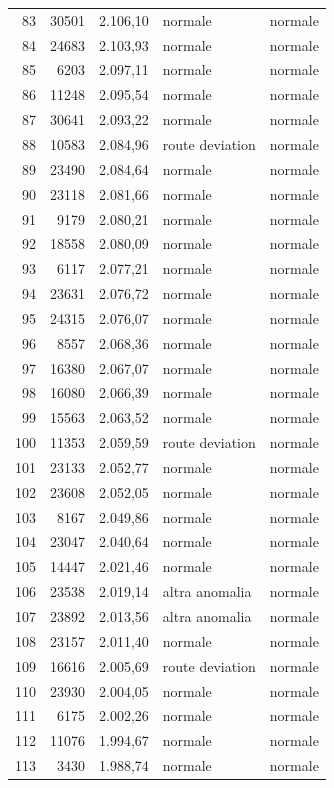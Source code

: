 {\begin{longtable}{rrrll}
83 & 30501 & 2.106,10 & normale & normale \\
84 & 24683 & 2.103,93 & normale & normale \\
85 & 6203 & 2.097,11 & normale & normale \\
86 & 11248 & 2.095,54 & normale & normale \\
87 & 30641 & 2.093,22 & normale & normale \\
88 & 10583 & 2.084,96 & route deviation & normale \\
89 & 23490 & 2.084,64 & normale & normale \\
90 & 23118 & 2.081,66 & normale & normale \\
91 & 9179 & 2.080,21 & normale & normale \\
92 & 18558 & 2.080,09 & normale & normale \\
93 & 6117 & 2.077,21 & normale & normale \\
94 & 23631 & 2.076,72 & normale & normale \\
95 & 24315 & 2.076,07 & normale & normale \\
96 & 8557 & 2.068,36 & normale & normale \\
97 & 16380 & 2.067,07 & normale & normale \\
98 & 16080 & 2.066,39 & normale & normale \\
99 & 15563 & 2.063,52 & normale & normale \\
100 & 11353 & 2.059,59 & route deviation & normale \\
101 & 23133 & 2.052,77 & normale & normale \\
102 & 23608 & 2.052,05 & normale & normale \\
103 & 8167 & 2.049,86 & normale & normale \\
104 & 23047 & 2.040,64 & normale & normale \\
105 & 14447 & 2.021,46 & normale & normale \\
106 & 23538 & 2.019,14 & altra anomalia & normale \\
107 & 23892 & 2.013,56 & altra anomalia & normale \\
108 & 23157 & 2.011,40 & normale & normale \\
109 & 16616 & 2.005,69 & route deviation & normale \\
110 & 23930 & 2.004,05 & normale & normale \\
111 & 6175 & 2.002,26 & normale & normale \\
112 & 11076 & 1.994,67 & normale & normale \\
113 & 3430 & 1.988,74 & normale & normale \\

\end{longtable}}
